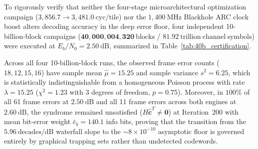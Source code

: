 \documentclass[10pt]{article}
\begin{document}
To rigorously verify that neither the four-stage microarchitectural optimization campaign ($3,856.7 \to 3,481.0\ \mathrm{cyc/tile}$) nor the $1,400\ \mathrm{MHz}$ Blackhole ARC clock boost alters decoding accuracy in the deep error floor, four independent 10-billion-block campaigns ($\mathbf{40,000,004,320\ \mathrm{blocks}}$ / $\mathbf{81.92\ \mathrm{trillion\ channel\ symbols}}$) were executed at $E_b/N_0 = 2.50\ \mathrm{dB}$, summarized in Table~\ref{tab:40b_certification}.

\begin{table}[!htbp]
\centering
\caption{\textbf{Multi-Run 40-Billion-Block Statistical Certification at $E_b/N_0 = 2.50\ \mathrm{dB}$ (200 Max Iterations, 440 Tensix Cores).}}
\label{tab:40b_certification}
\end{table}

Across all four 10-billion-block runs, the observed frame error counts ($18, 12, 15, 16$) have sample mean $\hat{\mu} = 15.25$ and sample variance $s^2 = 6.25$, which is statistically indistinguishable from a homogeneous Poisson process with rate $\lambda = 15.25$ ($\chi^2 = 1.23$ with $3$ degrees of freedom, $p = 0.75$). Moreover, in $100\%$ of all 61 frame errors at $2.50\ \mathrm{dB}$ and all 11 frame errors across both engines at $2.60\ \mathrm{dB}$, the syndrome remained unsatisfied ($H\hat{\mathbf{c}}^T \ne \mathbf{0}$) at Iteration~200 with mean bit-error weight $\bar{e}_b = 140.1$ info bits, proving that the transition from the $5.96\ \mathrm{decades/dB}$ waterfall slope to the $\sim 8 \times 10^{-10}$ asymptotic floor is governed entirely by graphical trapping sets rather than undetected codewords.
\end{document}
